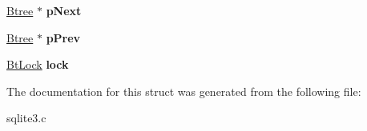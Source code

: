 \begin{DoxyCompactItemize}
\item 
\hyperlink{structBtree}{Btree} $\ast$ {\bfseries p\+Next}\hypertarget{structBtree_a9e6d2ca44c10ed8ef0be004225a74ef5}{}\label{structBtree_a9e6d2ca44c10ed8ef0be004225a74ef5}

\item 
\hyperlink{structBtree}{Btree} $\ast$ {\bfseries p\+Prev}\hypertarget{structBtree_a0423f1c55c1fe6812161a49bb2bf604f}{}\label{structBtree_a0423f1c55c1fe6812161a49bb2bf604f}

\item 
\hyperlink{structBtLock}{Bt\+Lock} {\bfseries lock}\hypertarget{structBtree_a943ed8799c9943f753a88cf44f1632dc}{}\label{structBtree_a943ed8799c9943f753a88cf44f1632dc}

\end{DoxyCompactItemize}


The documentation for this struct was generated from the following file\+:\begin{DoxyCompactItemize}
\item 
sqlite3.\+c\end{DoxyCompactItemize}
